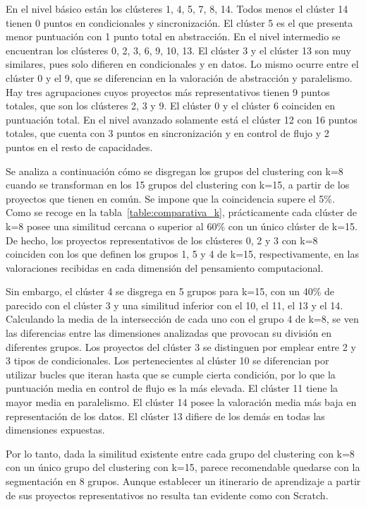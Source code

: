\documentclass[a4paper, 12pt]{book}
\begin{document}
En el nivel básico están los clústeres 1, 4, 5, 7, 8, 14. Todos menos el clúster 14 tienen 0 puntos en condicionales y sincronización. El clúster 5 es el que presenta menor puntuación con 1 punto total en abstracción. 
En el nivel intermedio se encuentran los clústeres 0, 2, 3, 6, 9, 10, 13. El clúster 3 y el clúster 13 son muy similares, pues solo difieren en condicionales y en datos. Lo mismo ocurre entre el clúster 0 y el 9, que se diferencian en la valoración de abstracción y paralelismo. Hay tres agrupaciones cuyos proyectos más representativos tienen 9 puntos totales, que son los clústeres 2, 3 y 9. El clúster 0 y el clúster 6 coinciden en puntuación total. En el nivel avanzado solamente está el clúster 12 con 16 puntos totales, que cuenta con 3 puntos en sincronización y en control de flujo y 2 puntos en el resto de capacidades.

Se analiza a continuación cómo se disgregan los grupos del clustering con k=8 cuando se transforman en los 15 grupos del clustering con k=15, a partir de los proyectos que tienen en común. Se impone que la coincidencia supere el 5\%. Como se recoge en la tabla~\ref{table:comparativa_k}, prácticamente cada clúster de k=8 posee una similitud cercana o superior al 60\% con un único clúster de k=15. De hecho, los proyectos representativos de los clústeres 0, 2 y 3 con k=8 coinciden con los que definen los grupos 1, 5 y 4 de k=15, respectivamente, en las valoraciones recibidas en cada dimensión del pensamiento computacional. 

Sin embargo, el clúster 4 se disgrega en 5 grupos para k=15, con un 40\% de parecido con el clúster 3 y una similitud inferior con el 10, el 11, el 13 y el 14. Calculando la media de la intersección de cada uno con el grupo 4 de k=8, se ven las diferencias entre las dimensiones analizadas que provocan su división en diferentes grupos. Los proyectos del clúster 3 se distinguen por emplear entre 2 y 3 tipos de condicionales. Los pertenecientes al clúster 10 se diferencian por utilizar bucles que iteran hasta que se cumple cierta condición, por lo que la puntuación media en control de flujo es la más elevada. El clúster 11 tiene la mayor media en paralelismo. El clúster 14 posee la valoración media más baja en representación de los datos. El clúster 13 difiere de los demás en todas las dimensiones expuestas.

Por lo tanto, dada la similitud existente entre cada grupo del clustering con k=8 con un único grupo del clustering con k=15,  parece recomendable quedarse con la segmentación en 8 grupos. Aunque establecer un itinerario de aprendizaje a partir de sus proyectos representativos no resulta tan evidente como con Scratch.
\end{document}
